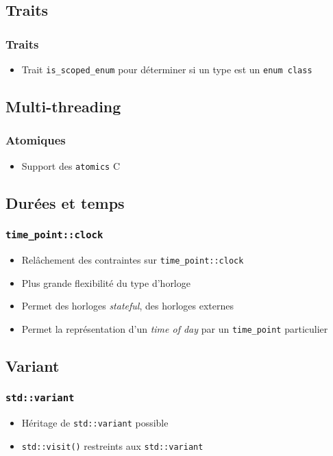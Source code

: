 \documentclass[C++.tex]{subfiles}
\begin{document}
\subsection*{Traits}
\begin{frame}[fragile]
	\frametitle{Traits}
	\begin{itemize}
		\item Trait \lstinline|is_scoped_enum| pour déterminer si un type est un \lstinline|enum class|
	\end{itemize}
\end{frame}

\subsection*{Multi-threading}
\begin{frame}[fragile]
	\frametitle{Atomiques}
	\begin{itemize}
		\item Support des \lstinline|atomics| C
	\end{itemize}
\end{frame}

\subsection*{Durées et temps}
\begin{frame}[fragile]
	\frametitle{\lstinline|time_point::clock|}
	\begin{itemize}
		\item Relâchement des contraintes sur \lstinline|time_point::clock|
		\item Plus grande flexibilité du type d'horloge
		\item Permet des horloges \textit{stateful}, des horloges externes
		\item Permet la représentation d'un \textit{time of day} par un \lstinline|time_point| particulier
	\end{itemize}
\end{frame}

\subsection*{Variant}
\begin{frame}[fragile]
	\frametitle{\lstinline|std::variant|}
	\begin{itemize}
		\item Héritage de \lstinline|std::variant| possible
		\item \lstinline|std::visit()| restreints aux \lstinline|std::variant|

	\end{itemize}
\end{frame}
\end{document}
